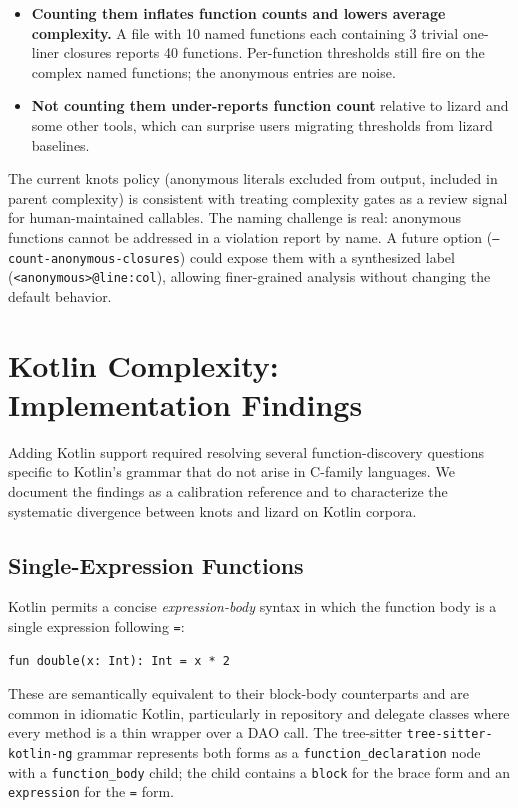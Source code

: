 \documentclass[10pt,twocolumn,letterpaper]{article}
\begin{document}
\begin{itemize}
  \item \textbf{Counting them inflates function counts and lowers average
    complexity.}  A file with 10 named functions each containing 3 trivial
    one-liner closures reports 40 functions.  Per-function thresholds still
    fire on the complex named functions; the anonymous entries are noise.
  \item \textbf{Not counting them under-reports function count} relative to
    lizard and some other tools, which can surprise users migrating
    thresholds from lizard baselines.
\end{itemize}

The current knots policy (anonymous literals excluded from output, included
in parent complexity) is consistent with treating complexity gates as a
review signal for human-maintained callables.  The naming challenge is real:
anonymous functions cannot be addressed in a violation report by name.
A future option (\texttt{--count-anonymous-closures}) could expose them with
a synthesized label (\texttt{<anonymous>@line:col}), allowing finer-grained
analysis without changing the default behavior.

\section{Kotlin Complexity: Implementation Findings}
\label{sec:kotlin-findings}

Adding Kotlin support required resolving several function-discovery questions
specific to Kotlin's grammar that do not arise in C-family languages.  We
document the findings as a calibration reference and to characterize the
systematic divergence between knots and lizard on Kotlin corpora.

\subsection{Single-Expression Functions}

Kotlin permits a concise \emph{expression-body} syntax in which the function
body is a single expression following \texttt{=}:

\begin{verbatim}
fun double(x: Int): Int = x * 2
\end{verbatim}

These are semantically equivalent to their block-body counterparts and are
common in idiomatic Kotlin, particularly in repository and delegate classes
where every method is a thin wrapper over a DAO call.  The tree-sitter
\texttt{tree-sitter-kotlin-ng} grammar represents both forms as a
\texttt{function\_declaration} node with a \texttt{function\_body} child; the
child contains a \texttt{block} for the brace form and an \texttt{expression}
for the \texttt{=} form.
\end{document}
